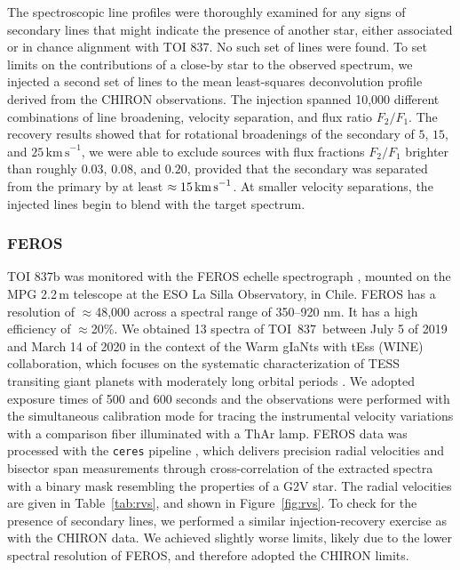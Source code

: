 \documentclass[12pt,twocolumn,tighten]{aastex63}
\newcommand{\tn}{TOI~837} %
\begin{document}
The spectroscopic line profiles were thoroughly examined for any signs
of secondary lines that might indicate the presence of another star,
either associated or in chance alignment with TOI 837. No such set of
lines were found. To set limits on the contributions of a close-by
star to the observed spectrum, we injected a second set of lines to
the mean least-squares deconvolution profile derived from the CHIRON
observations. The injection spanned 10,000 different combinations of
line broadening, velocity separation, and flux ratio $F_2/F_1$. The
recovery results showed that for rotational broadenings of the
secondary of $5$, $15$, and $25\,\mathrm{km\,s}^{-1}$, we were able to
exclude sources with flux fractions $F_2/F_1$ brighter than roughly
$0.03$, $0.08$, and $0.20$, provided that the secondary was separated
from the primary by at least $\approx 15\,{\rm km\,s}^{-1}$.  At
smaller velocity separations, the injected lines begin to blend with
the target spectrum.


\subsubsection{FEROS}
TOI 837b was monitored with the FEROS echelle spectrograph
\citep{kaufer_commissioning_1999}, mounted on the MPG 2.2$\,$m
telescope at the ESO La Silla Observatory, in Chile. FEROS has a
resolution of $\approx$48,000 across a spectral range of 350–920 nm.
It has a high efficiency of $\approx$20\%. We obtained 13
spectra of \tn\ between July 5 of 2019 and March 14 of 2020 in the
context of the Warm gIaNts with tEss (WINE) collaboration, which
focuses on the systematic characterization of TESS transiting giant
planets with moderately long orbital periods \citep[{\it
e.g.},][]{brahm:2019,jordan:2020}.  We adopted exposure times of 500
and 600 seconds and the observations were performed with the
simultaneous calibration mode for tracing the instrumental velocity
variations with a comparison fiber illuminated with a ThAr lamp. FEROS
data was processed with the \texttt{ceres} pipeline
\citep{brahm_2017_ceres}, which delivers precision radial velocities
and bisector span measurements through cross-correlation of the
extracted spectra with a binary mask resembling the properties of a
G2V star. The radial velocities are given in Table~\ref{tab:rvs}, and
shown in Figure~\ref{fig:rvs}.  To check for the presence of secondary
lines, we performed a similar injection-recovery exercise as with the
CHIRON data.  We achieved slightly worse limits, likely due to the
lower spectral resolution of FEROS, and therefore adopted the CHIRON
limits.
\end{document}
